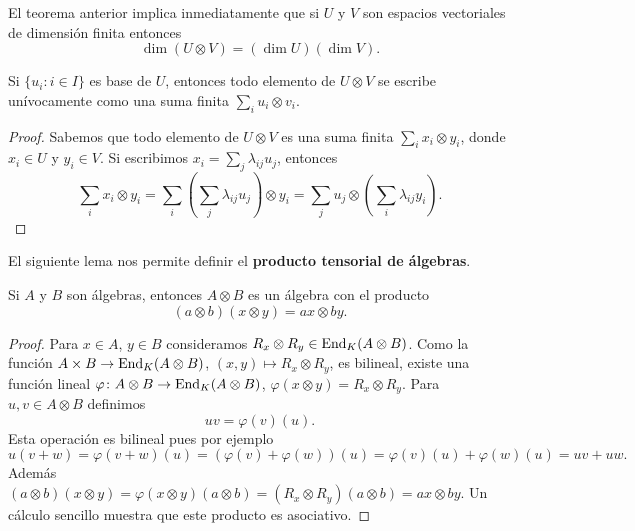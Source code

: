 El teorema anterior implica inmediatamente que si $U$ y $V$ son espacios
vectoriales de dimensión finita entonces
\[
	\dim(U\otimes V)=(\dim U)(\dim V).
\]

\begin{corollary}
	Si $\{u_i:i\in I\}$ es base de $U$, entonces todo elemento de $U\otimes V$
	se escribe unívocamente como una suma finita $\sum_{i}u_i\otimes v_i$.
\end{corollary}

\begin{proof}
	Sabemos que todo elemento de $U\otimes V$ es una suma finita
	$\sum_i x_i\otimes y_i$, donde $x_i\in U$ y $y_i\in V$. Si escribimos 
	$x_i=\sum_j\lambda_{ij}u_j$, entonces
	\[
		\sum_i x_i\otimes y_i=\sum_i\left(\sum_j\lambda_{ij}u_j\right)\otimes y_i		
		=\sum_j u_j\otimes\left(\sum_i\lambda_{ij}y_i\right).
	\]
\end{proof}

%

El siguiente lema nos permite definir el \textbf{producto tensorial de
álgebras}.

\begin{lemma}
	Si $A$ y $B$ son álgebras, entonces $A\otimes B$ es un álgebra con el
	producto
	\[
		(a\otimes b)(x\otimes y)=ax\otimes by.
	\]
\end{lemma}

\begin{proof}
	Para $x\in A$, $y\in B$ consideramos $R_x\otimes R_y\in\operatorname{End}_K(A\otimes B)$.
	Como la función $A\times B\to\operatorname{End}_K(A\otimes B)$, $(x,y)\mapsto R_x\otimes
	R_y$, es bilineal, existe una función lineal $\varphi\colon A\otimes
	B\to\operatorname{End}_K(A\otimes B)$, $\varphi(x\otimes y)=R_x\otimes R_y$. Para $u,v\in A\otimes B$ definimos
	\[
		uv=\varphi(v)(u).
	\]
	Esta operación es bilineal pues por ejemplo
	\[
		u(v+w)=\varphi(v+w)(u)=(\varphi(v)+\varphi(w))(u)=\varphi(v)(u)+\varphi(w)(u)=uv+uw.
	\]
	Además
	$(a\otimes b)(x\otimes y)=\varphi(x\otimes y)(a\otimes b)=(R_x\otimes R_y)(a\otimes b)=ax\otimes by$.
	Un cálculo sencillo muestra que este producto es asociativo.
\end{proof}

